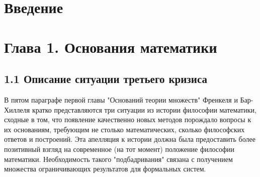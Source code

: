 \documentclass[14pt]{extarticle}
\begin{document}


\newpage
\tableofcontents
\thispagestyle{empty} 
\newpage

	\section*{Введение}
	
	
	
	\newpage
	\section*{Глава 1. Основания математики}
	
	\subsection*{1.1 Описание ситуации третьего кризиса}
	
	В пятом параграфе первой главы "Оснований теории множеств" Френкеля и Бар-Хиллеля \cite[26]{SetTheory} кратко представляются три ситуации из истории философии математики, сходные в том, что появление качественно новых методов порождало вопросы к их основаниям, требующим не столько математических, сколько философских ответов и построений. Эта апелляция к истории должна была предоставить более позитивный взгляд на современное (на тот момент) положение философии математики. Необходимость такого "подбадривания" связана с получением множества ограничивающих результатов для формальных систем.
	
\end{document}
